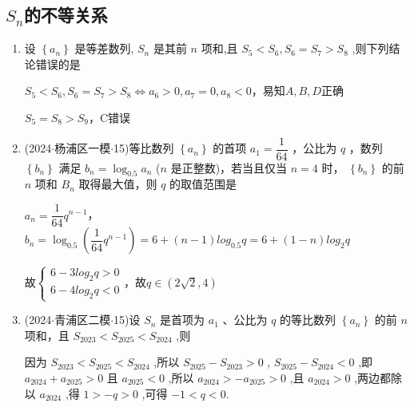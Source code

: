 \subsection*{$S_n$的不等关系}
\begin{enumerate}
    \item 设 $\left\{  {a}_{n}\right\}$ 是等差数列, ${S}_{n}$ 是其前 $n$ 项和,且 ${S}_{5} < {S}_{6},{S}_{6} = {S}_{7} > {S}_{8}$ ,则下列结论错误的是 
    \begin{jieda}
        ${S}_{5} < {S}_{6},{S}_{6} = {S}_{7} > {S}_{8} \Longleftrightarrow a_6 > 0, a_7 = 0, a_8 < 0$，易知$A,B,D$正确

        $S_5 = S_8 > S_9$，C错误
    \end{jieda}
    \item (2024$\cdot$杨浦区一模$\cdot$15)等比数列 $\left\{  {a}_{n}\right\}$ 的首项 ${a}_{1} = \dfrac{1}{64}$ ，公比为 $q$ ，数列 $\left\{  {b}_{n}\right\}$ 满足 ${b}_{n} = {\log }_{0.5}{a}_{n}$ ($n$ 是正整数)，若当且仅当 $n = 4$ 时， $\left\{  {b}_{n}\right\}$ 的前 $n$ 项和 ${B}_{n}$ 取得最大值，则 $q$ 的取值范围是
    \begin{jieda}
        $a_n = \dfrac{1}{64}q^{n-1}$，$b_n = {\log }_{0.5}\left(\dfrac{1}{64}q^{n-1}\right) = 6 + (n-1)log_{0.5}q = 6+(1-n)log_2q$

        故$\left\{\begin{array}{l}
            6-3log_2q > 0 \\
            6-4log_2q < 0
        \end{array}\right.$，故$q \in \left( {2\sqrt{2},4}\right)$
    \end{jieda}
    
    \item (2024$\cdot$青浦区二模$\cdot$15)设 ${S}_{n}$ 是首项为 ${a}_{1}$ 、公比为 $q$ 的等比数列 $\left\{  {a}_{n}\right\}$ 的前 $n$ 项和，且 ${S}_{2023} <  {S}_{2025} < {S}_{2024}$ ,则 
    \begin{jieda}
        因为 ${S}_{2023} < {S}_{2025} < {S}_{2024}$ ,所以 ${S}_{2025} - {S}_{2023} > 0$ , ${S}_{2025} - {S}_{2024} < 0$ ,即 ${a}_{2024} + {a}_{2025} > 0$ 且 ${a}_{2025} < 0$ ,所以 ${a}_{2024} >  - {a}_{2025} > 0$ ,且 ${a}_{2024} > 0$ ,两边都除以 ${a}_{2024}$ ,得 $1 >  - q > 0$ ,可得 $- 1 < q < 0$.
        

\end{jieda}
\end{enumerate}
